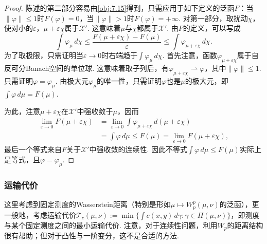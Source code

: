 \begin{proof}
陈述的第二部分容易由\autoref{obj:7.15}得到，只需应用于如下定义的泛函$F$：当$\|\varphi\|\leq1$时$F(\varphi)=0$，当$\|\varphi\|>1$时$F(\varphi)=+\infty$. 对第一部分，取扰动$\chi$，使对小的$\varepsilon$，$\mu+\varepsilon\chi$属于$\mathscr X'$. 这意味着$\mu$与$\chi$都属于$\mathscr X'$. 由$F$的定义，可以写成
\[
 \int\varphi_\mu\,d\chi\leq\frac{F(\mu+\varepsilon\chi)-F(\mu)}\varepsilon
                  \leq\int\varphi_{\mu+\varepsilon\chi}\,d\chi.
\]
为了取极限，只需证明当$\varepsilon\to0$时右端趋于$\int\varphi_\mu\,d\chi$. 首先注意，函数$\varphi_{\mu+\varepsilon\chi}$属于自反可分Banach空间的单位球. 这意味着取子列后，有$\varphi_{\mu+\varepsilon\chi}\rightharpoonup\varphi$，其中$\|\varphi\|\leq1$. 只需证明$\varphi=\varphi_\mu$. 由极大元$\varphi_\mu$的唯一性，只需证明$\varphi$也是$\mu$的极大元，即$\int\varphi\,d\mu=F(\mu)$.

为此，注意$\mu+\varepsilon\chi$在$\mathscr X'$中强收敛于$\mu$，因而
\[
\begin{aligned}
 \lim_{\varepsilon\to0}F(\mu+\varepsilon\chi)
 &=\lim_{\varepsilon\to0}\int\varphi_{\mu+\varepsilon\chi}\,d(\mu+\varepsilon\chi)\\
 &=\int\varphi\,d\mu\leq F(\mu)=\lim_{\varepsilon\to0}F(\mu+\varepsilon\chi),
\end{aligned}
\]
最后一个等式来自$F$关于$\mathscr X'$中强收敛的连续性. 因此不等式$\int\varphi\,d\mu\leq F(\mu)$实际上是等式，且$\varphi=\varphi_\mu$.
\end{proof}

\subsubsection{运输代价}\label{sec:7.2.2}
这里考虑到固定测度的Wasserstein距离（特别是形如$\mu\mapsto W_p^p(\mu,\nu)$的泛函），更一般地，考虑运输代价$\mathscr T_c(\mu,\nu):=\min\{\int c(x,y)\,d\gamma:\gamma\in\Pi(\mu,\nu)\}$，即测度与某个固定测度之间的最小运输代价. 注意，对于连续性问题，利用$W_p$的距离结构很有帮助；但对于凸性与一阶变分，这不是合适的方法.

